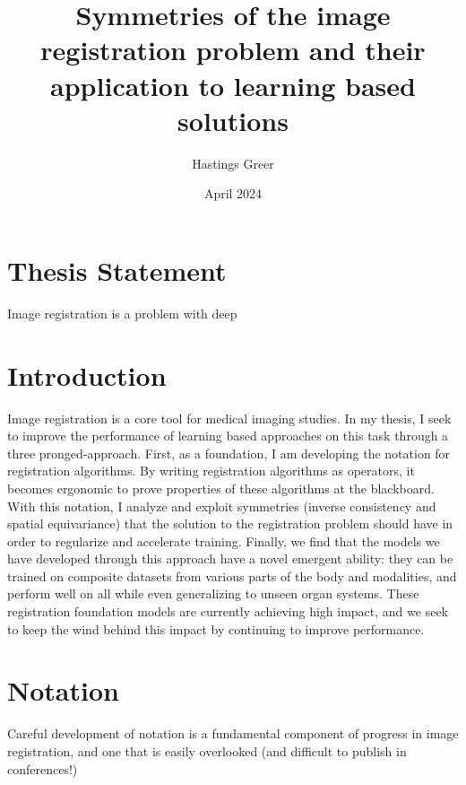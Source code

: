 \documentclass{article}
\title{Symmetries of the image registration problem and their application to learning based solutions}
\author{Hastings Greer }
\date{April 2024}
\begin{document}
\maketitle

\section{Thesis Statement}
Image registration is a problem with deep 

\section{Introduction}

Image registration is a core tool for medical imaging studies. In my thesis, I
seek to improve the performance of learning based approaches on this task
through a three pronged-approach. First, as a foundation, I am developing the
notation for registration algorithms. By writing registration algorithms as
operators, it becomes ergonomic to prove properties of these algorithms at the
blackboard.
With this notation, I analyze and exploit symmetries (inverse consistency and spatial
equivariance) that the solution to the registration problem should have in
order to regularize and accelerate training. Finally, we find that the models we have developed through this approach have a novel emergent ability: they can be trained on composite datasets from various parts of the body and modalities, and perform well on all while even generalizing to unseen organ systems. These registration foundation models are currently achieving high impact, and we seek to keep the wind behind this impact by continuing to improve performance.

\section{Notation}

Careful development of notation is a fundamental component of progress in image
registration, and one that is easily overlooked (and difficult to publish in
conferences!)
\end{document}
